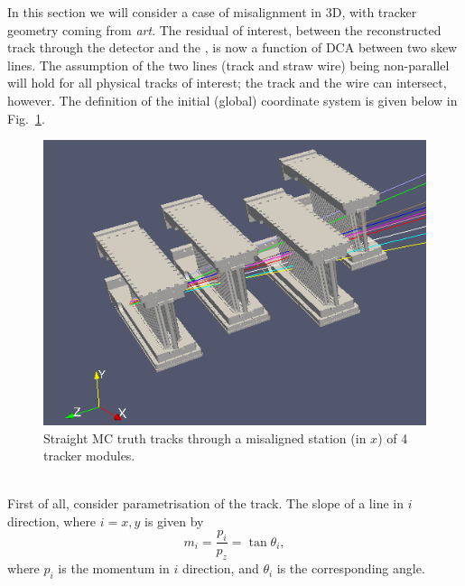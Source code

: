 \documentclass[a4paper,11pt]{article}
\begin{document}
In this section we will consider a case of misalignment in 3D, with tracker geometry coming from \textit{art}. The residual of interest, between the reconstructed track through the detector and the , is now a function of DCA between two skew lines. The assumption of the two lines (track and straw wire) being non-parallel will hold for all physical tracks of interest; the track and the wire can intersect, however. The definition of the initial (global) coordinate system is given below in Fig.~\ref{fig:4M}. \\
\vspace{-0.2cm}
\begin{figure}[!ht]
\centering
\includegraphics[scale = 0.45]{fig/4M.png}  
    \vspace{-0.1cm}
    \caption{Straight MC truth tracks through a misaligned station (in $x$) of 4 tracker modules.}
\label{fig:4M} 
\end{figure}
\vspace{-0.2cm} \\
First of all, consider parametrisation of the track. The slope of a line in $i$ direction, where $i=x, y$ is given by
\begin{equation}
m_i = \frac{p_i}{p_z}=\tan\theta_i, 	
\end{equation}
where $p_i$ is the momentum in $i$ direction, and $\theta_i$ is the corresponding angle. 
\end{document}
